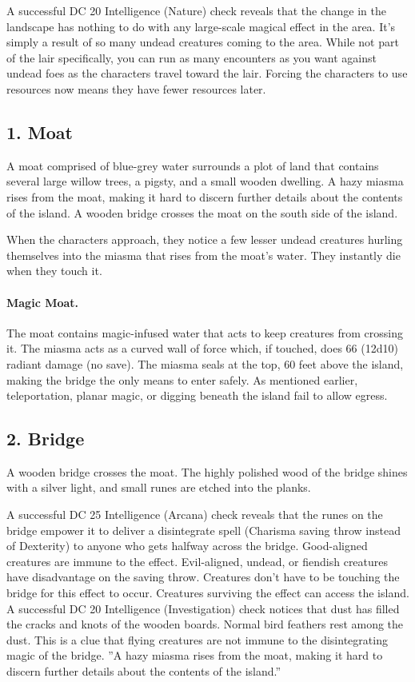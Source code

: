 \documentclass[10pt,a4paper,twoside,twocolumn,openany,bg=print,nodeprecatedcode]{dndbook}
\begin{document}
A successful DC 20 Intelligence (Nature) check reveals that the change in the landscape has nothing to do with any large-scale magical effect in the area. It's simply a result of so many undead creatures coming to the area.
While not part of the lair specifically, you can run as many encounters as you want against undead foes as the characters travel toward the lair. Forcing the characters to use resources now means they have fewer resources later.
\subsection{1. Moat}
\begin{DndReadAloud}{}
A moat comprised of blue-grey water surrounds a plot of land that contains several large willow trees, a pigsty, and a small wooden dwelling. A hazy miasma rises from the moat, making it hard to discern further details about the contents of the island. A wooden bridge crosses the moat on the south side of the island.
\end{DndReadAloud}

When the characters approach, they notice a few lesser undead creatures hurling themselves into the miasma that rises from the moat's water. They instantly die when they touch it.
\paragraph{Magic Moat.}
The moat contains magic-infused water that acts to keep creatures from crossing it. The miasma acts as a curved wall of force which, if touched, does 66 (12d10) radiant damage (no save). The miasma seals at the top, 60 feet above the island, making the bridge the only means to enter safely. As mentioned earlier, teleportation, planar magic, or digging beneath the island fail to allow egress.
\subsection{2. Bridge}
\begin{DndReadAloud}{}
A wooden bridge crosses the moat. The highly polished wood of the bridge shines with a silver light, and small runes are etched into the planks.
\end{DndReadAloud}

A successful DC 25 Intelligence (Arcana) check reveals that the runes on the bridge empower it to deliver a disintegrate spell (Charisma saving throw instead of Dexterity) to anyone who gets halfway across the bridge. Good-aligned creatures are immune to the effect. Evil-aligned, undead, or fiendish creatures have disadvantage on the saving throw. Creatures don't have to be touching the bridge for this effect to occur. Creatures surviving the effect can access the island.
A successful DC 20 Intelligence (Investigation) check notices that dust has filled the cracks and knots of the wooden boards. Normal bird feathers rest among the dust. This is a clue that flying creatures are not immune to the disintegrating magic of the bridge.
\DndQuote%
{}
{''A hazy miasma rises from the moat, making it hard to discern further details about the contents of the island.''}
{}
\end{document}
